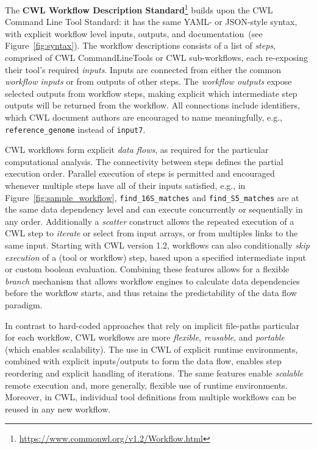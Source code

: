 \documentclass[sigconf,revew,screen,timestamp,nonacm]{acmart}
\begin{document}
The \textbf{CWL Workflow Description Standard}\footnote{\url{https://www.commonwl.org/v1.2/Workflow.html}} builds upon the CWL Command Line Tool Standard: it has the same YAML- or JSON-style syntax, with explicit workflow level inputs, outputs, and documentation~(see Figure~\ref{fig:syntax}). The workflow descriptions consists of a list of \textit{steps}, comprised of CWL CommandLineTools or CWL sub-workflows, each re-exposing their tool's required \textit{inputs}. Inputs are connected from either the common \textit{workflow inputs} or from outputs of other steps. The \textit{workflow outputs} expose selected outputs from workflow steps, making explicit which intermediate step outputs will be returned from the workflow. All connections include identifiers, which CWL document authors are encouraged to name meaningfully, e.g., \texttt{reference\_genome} instead of \texttt{input7}.

CWL workflows form explicit \textit{data flows}, as required for the particular computational analysis. The connectivity between steps defines the partial execution order. Parallel execution of steps is permitted and encouraged whenever multiple steps have all of their inputs satisfied, e.g., in Figure~\ref{fig:sample_workflow}, \texttt{find\_16S\_matches} and \texttt{find\_S5\_matches} are at the same data dependency level and can execute concurrently or sequentially in any order. Additionally a \textit{scatter} construct allows the repeated execution of a CWL step to \textit{iterate} or select from input arrays, or from multiples links to the same input. Starting with CWL version 1.2, workflows can also conditionally \textit{skip execution} of a (tool or workflow) step, based upon a specified intermediate input or custom boolean evaluation. Combining these features allows for a flexible \textit{branch} mechanism that allows workflow engines to calculate data dependencies before the workflow starts, and thus retains the predictability of the data flow paradigm.

In contrast to hard-coded approaches that rely on implicit file-paths particular for each workflow, CWL workflows are more \textit{flexible}, \textit{reusable}, and \textit{portable} (which enables scalability). The use in CWL of explicit runtime environments, combined with explicit inputs/outputs to form the data flow, enables step reordering and explicit handling of iterations. The same features enable \textit{scalable} remote execution and, more generally, flexible use of runtime environments. Moreover, in CWL, individual tool definitions from multiple workflows can be reused in any new workflow. 
\end{document}
